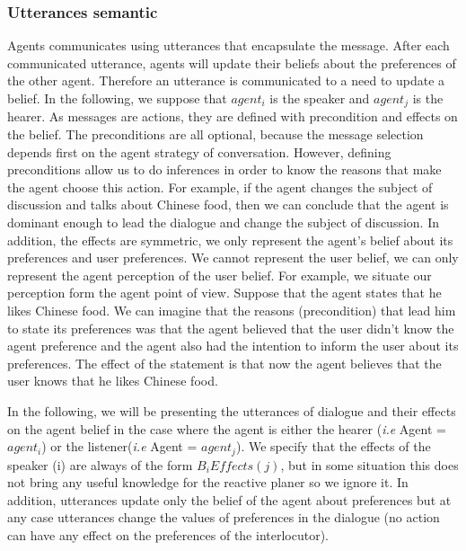 \documentclass{llncs}
\begin{document}
\subsubsection{Utterances semantic}
Agents communicates using utterances that encapsulate the message. After each communicated utterance, agents will update their beliefs about the preferences of the other agent. Therefore an utterance is communicated to a need to update a belief. In the following, we suppose that $agent_{i}$ is the speaker and $agent_{j}$ is the hearer. As messages are actions, they are defined with precondition and effects on the belief. The preconditions are all optional, because the message selection depends first on the agent strategy of conversation. However, defining preconditions allow us to do inferences in order to know the reasons that make the agent choose this action. For example, if the agent changes the subject of discussion and talks about Chinese food, then we can conclude that the agent is dominant enough to lead the dialogue and change the subject of discussion. In addition, the effects are symmetric, we only represent the  agent's belief about its preferences and user preferences. We cannot represent the user belief, we can only represent the agent perception of the user belief. For example, we situate our perception form the agent point of view. Suppose that the agent states that he likes Chinese food.  We can imagine that the reasons (precondition) that lead him  to state its preferences was that the agent believed that the user didn't know the agent preference and the agent also had the intention to inform the user about its preferences. The effect of the statement is that now the agent believes that the user knows that he likes Chinese food. 

In the following, we will be presenting  the utterances of dialogue and their effects on the agent belief in the case where the agent is either the hearer (\textit{i.e} Agent = $agent_i$) or  the listener(\textit{i.e} Agent = $agent_j$). We specify that the effects of the speaker (i)  are always of the form $B_i Effects(j)$, but in some situation this does not bring any useful knowledge for the reactive planer so we ignore it. In addition, utterances update only the belief of the agent about preferences but at any case utterances change the values of preferences in the dialogue (no action can have any effect on the preferences of the interlocutor). 

\end{document}
